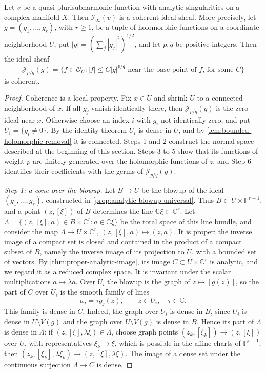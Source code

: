 \begin{theorem}\label{thm:analytic-bounded-growth-coherence}
Let $v$ be a quasi-plurisubharmonic function with analytic singularities on a complex manifold $X$. Then $\mathcal I_\infty(v)$ is a coherent ideal sheaf. More precisely, let $g=(g_1,\ldots,g_r)$, with $r\geq1$, be a tuple of holomorphic functions on a coordinate neighborhood $U$, put $|g|=(\sum_j|g_j|^2)^{1/2}$, and let $p,q$ be positive integers. Then the ideal sheaf
\[
 \mathcal J_{p/q}(g)=\{f\in\mathcal O_U:
               |f|\leq C|g|^{p/q}\text{ near the base point of $f$, for some }C\}
\]
is coherent.
\end{theorem}
\begin{proof}
Coherence is a local property. Fix $x\in U$ and shrink $U$ to a connected neighborhood of $x$. If all $g_j$ vanish identically there, then $\mathcal J_{p/q}(g)$ is the zero ideal near $x$. Otherwise choose an index $i$ with $g_i$ not identically zero, and put $U_i=\{g_i\ne0\}$. By the identity theorem $U_i$ is dense in $U$, and by \cref{lem:bounded-holomorphic-removal} it is connected. Steps 1 and 2 construct the normal space described at the beginning of this section, Steps 3 to 5 show that its functions of weight $p$ are finitely generated over the holomorphic functions of $z$, and Step 6 identifies their coefficients with the germs of $\mathcal J_{p/q}(g)$.

\emph{Step 1: a cone over the blowup.} Let $B\to U$ be the blowup of the ideal $(g_1,\ldots,g_r)$, constructed in \cref{prop:analytic-blowup-universal}. Thus $B\subset U\times\mathbb P^{r-1}$, and a point $(z,[\xi])$ of $B$ determines the line $\mathbb C\xi\subset\mathbb C^r$. Let $\Lambda=\{(z,[\xi],a)\in B\times\mathbb C^r:a\in\mathbb C\xi\}$ be the total space of this line bundle, and consider the map $\Lambda\to U\times\mathbb C^r$, $(z,[\xi],a)\mapsto(z,a)$. It is proper: the inverse image of a compact set is closed and contained in the product of a compact subset of $B$, namely the inverse image of its projection to $U$, with a bounded set of vectors. By \cref{thm:proper-analytic-image}, its image $C\subset U\times\mathbb C^r$ is analytic, and we regard it as a reduced complex space. It is invariant under the scalar multiplications $a\mapsto\lambda a$. Over $U_i$ the blowup is the graph of $z\mapsto[g(z)]$, so the part of $C$ over $U_i$ is the smooth family of lines
\[
 a_j=\tau g_j(z),\qquad z\in U_i,\quad\tau\in\mathbb C.
\]
This family is dense in $C$. Indeed, the graph over $U_i$ is dense in $B$, since $U_i$ is dense in $U\setminus V(g)$ and the graph over $U\setminus V(g)$ is dense in $B$. Hence its part of $\Lambda$ is dense in $\Lambda$: if $(z,[\xi],\lambda\xi)\in\Lambda$, choose graph points $(z_k,[\xi_k])\to(z,[\xi])$ over $U_i$ with representatives $\xi_k\to\xi$, which is possible in the affine charts of $\mathbb P^{r-1}$; then $(z_k,[\xi_k],\lambda\xi_k)\to(z,[\xi],\lambda\xi)$. The image of a dense set under the continuous surjection $\Lambda\to C$ is dense.


\end{proof}
